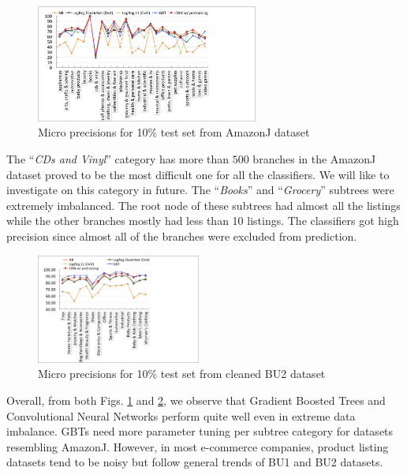 \begin{figure}
	\vspace{-0.5cm}
	\centering
	\includegraphics[width=0.65\textwidth]{images/amazonj-WUC-predictions}
	\vspace{-0.4cm}
	\caption{Micro precisions for 10\% test set from AmazonJ dataset}
	\label{Figure_amazonj-WUC-predictions}
	\vspace{-0.4cm}
\end{figure}
The ``\textit{CDs and Vinyl}'' category has more than $500$ branches in the AmazonJ dataset proved to be the most difficult one for all the classifiers.
We will like to investigate on this category in future.
The ``\textit{Books}'' and ``\textit{Grocery}'' subtrees were extremely imbalanced.
The root node of these subtrees had almost all the listings while the other branches mostly had less than 10 listings. 
The classifiers got high precision since almost all of the branches were excluded from prediction.


\begin{figure}
	\vspace{-0.8cm}
	\centering
	\includegraphics[width=0.48\textwidth]{images/BU2-WUC-predictions}
	\vspace{-0.4cm}
	\caption{Micro precisions for 10\% test set from cleaned BU2 dataset}
	\label{Figure_BU2-WUC-predictions}
	\vspace{-0.4cm}
\end{figure}
Overall, from both Figs. \ref{Figure_amazonj-WUC-predictions} and \ref{Figure_BU2-WUC-predictions}, we observe that Gradient Boosted Trees and Convolutional Neural Networks perform quite well even in extreme data imbalance.
GBTs need more parameter tuning per subtree category for datasets resembling AmazonJ.
However, in most e-commerce companies, product listing datasets tend to be noisy but follow general trends of BU1 and BU2 datasets. 


